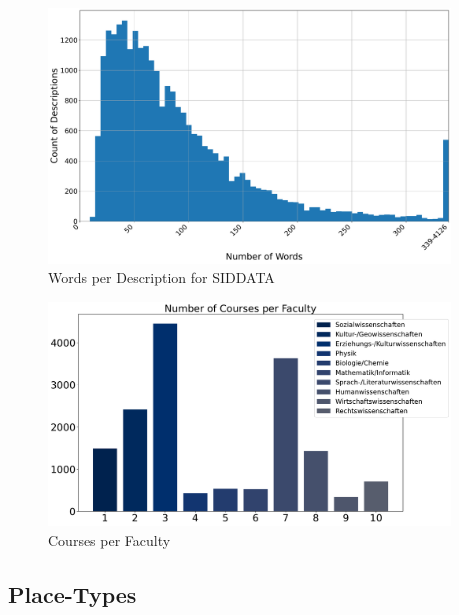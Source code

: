 \begin{figure}[H]
	\centering
	\includegraphics[width=0.95\textwidth]{graphics/dataset_new/words_per_desc.pdf}
	\caption{Words per Description for SIDDATA}
	\label{fig:sid_wordsperdesc}
\end{figure}

\begin{figure}[H]
	\centering
	\includegraphics[width=0.95\textwidth]{graphics/dataset_new/courses_per_faculty.pdf}
	\caption{Courses per Faculty}
	\label{fig:courses_per_faculty}
\end{figure}





\subsection{Place-Types}
\label{sec:dataset_placetypes}


